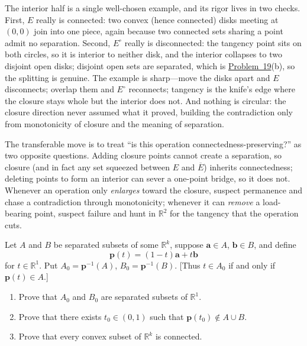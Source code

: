 \documentclass[main.tex]{subfiles}
\begin{document}
\begin{Reflection}
The interior half is a single well-chosen example, and its rigor lives in two checks. First, $E$ really
is connected: two convex (hence connected) disks meeting at $(0,0)$ join into one piece, again because
two connected sets sharing a point admit no separation. Second, $E^{\circ}$ really is disconnected: the
tangency point sits on both circles, so it is interior to neither disk, and the interior collapses to two
disjoint open disks; disjoint open sets are separated, which is \hyperlink{prob:19}{Problem~19}(b), so the
splitting is genuine. The example is sharp---move the disks apart and $E$ disconnects; overlap them and
$E^{\circ}$ reconnects; tangency is the knife's edge where the closure stays whole but the interior does
not. And nothing is circular: the closure direction never assumed what it proved, building the
contradiction only from monotonicity of closure and the meaning of separation.

The transferable move is to treat ``is this operation connectedness-preserving?'' as two opposite
questions. Adding closure points cannot create a separation, so closure (and in fact any set squeezed
between $E$ and $\overline E$) inherits connectedness; deleting points to form an interior can sever a
one-point bridge, so it does not. Whenever an operation only \emph{enlarges} toward the closure, suspect
permanence and chase a contradiction through monotonicity; whenever it can \emph{remove} a load-bearing
point, suspect failure and hunt in $\mathbb R^2$ for the tangency that the operation cuts.
\end{Reflection}

Let $A$ and $B$ be separated subsets of some $\mathbb R^{k}$, suppose $\mathbf a\in A$, $\mathbf b\in B$,
and define
\[
\mathbf p(t)=(1-t)\mathbf a+t\mathbf b
\]
for $t\in\mathbb R^{1}$. Put $A_{0}=\mathbf p^{-1}(A)$, $B_{0}=\mathbf p^{-1}(B)$. [Thus $t\in A_{0}$ if
and only if $\mathbf p(t)\in A$.]
\begin{enumerate}
  \item Prove that $A_{0}$ and $B_{0}$ are separated subsets of $\mathbb R^{1}$.
  \item Prove that there exists $t_{0}\in(0,1)$ such that $\mathbf p(t_{0})\notin A\cup B$.
  \item Prove that every convex subset of $\mathbb R^{k}$ is connected.
\end{enumerate}
\end{document}
